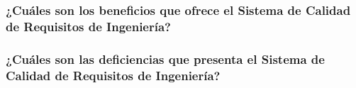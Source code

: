 \documentclass[runningheads,a4paper]{llncs}
\begin{document}
\subsubsection{¿Cuáles son los beneficios que ofrece el Sistema de Calidad de Requisitos de Ingeniería?}

\subsubsection{¿Cuáles son las deficiencias que presenta el Sistema de Calidad de Requisitos de Ingeniería?}



\printnoidxglossaries     
         


\end{document}
